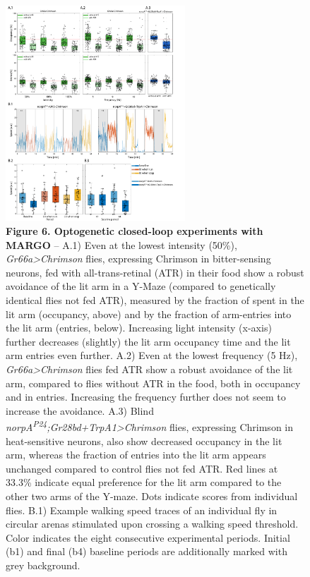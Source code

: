 \documentclass[10pt]{article}
\begin{document}
\newpage
\begin{figure}[t!]
	\begin{center}
		\includegraphics[width=0.6\textwidth]{../figures/figZach_modif2.pdf}
	\end{center}
	\caption*{\footnotesize \textbf{Figure 6. Optogenetic closed-loop experiments with MARGO} -- A.1) Even at the lowest intensity (50\%), \textit{Gr66a>Chrimson} flies, expressing Chrimson in bitter-sensing neurons, fed with all-trans-retinal (ATR) in their food show a robust avoidance of the lit arm in a Y-Maze (compared to genetically identical flies not fed ATR), measured by the fraction of spent in the lit arm (occupancy, above) and by the fraction of arm-entries into the lit arm (entries, below). Increasing light intensity (x-axis) further decreases (slightly) the lit arm occupancy time and the lit arm entries even further.
	A.2) Even at the lowest frequency (5 Hz), \textit{Gr66a>Chrimson} flies fed ATR show a robust avoidance of the lit arm, compared to flies without ATR in the food, both in occupancy and in entries. Increasing the frequency further does not seem to increase the avoidance. 
	A.3) Blind \textit{norpA\textsuperscript{P24};Gr28bd+TrpA1>Chrimson} flies, expressing Chrimson in heat-sensitive neurons, also show decreased occupancy in the lit arm, whereas the fraction of entries into the lit arm appears unchanged compared to control flies not fed ATR. 
	Red lines at 33.3\% indicate equal preference for the lit arm compared to the other two arms of the Y-maze. Dots indicate scores from individual flies. 
	B.1) Example walking speed traces of an individual fly in circular arenas stimulated upon crossing a walking speed threshold. Color  indicates the eight consecutive experimental periods. Initial (b1) and final (b4) baseline periods are additionally marked with grey background. 
}
\end{figure}
\end{document}
